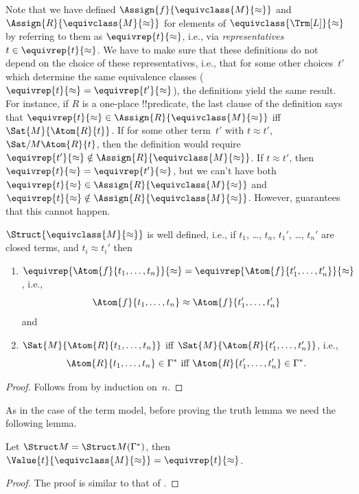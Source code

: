 \documentclass[../../../include/open-logic-section]{subfiles}
\begin{document}
\begin{explain}
Note that we have defined $\Assign{f}{\equivclass{M}{\approx}}$ and
$\Assign{R}{\equivclass{M}{\approx}}$ for elements of
$\equivclass{\Trm[L]}{\approx}$ by referring to them as
$\equivrep{t}{\approx}$, i.e., via \emph{representatives}~$t \in
\equivrep{t}{\approx}$.  We have to make sure that these definitions
do not depend on the choice of these representatives, i.e., that for
some other choices~$t'$ which determine the same equivalence classes
($\equivrep{t}{\approx} = \equivrep{t'}{\approx}$), the definitions
yield the same result. For instance, if $R$ is a one-place
!!{predicate}, the last clause of the definition says that
$\equivrep{t}{\approx} \in \Assign{R}{\equivclass{M}{\approx}}$ iff
$\Sat{M}{\Atom{R}{t}}$. If for some other term~$t'$ with $t \approx
t'$, $\Sat/{M}{\Atom{R}{t}}$, then the definition would require
$\equivrep{t'}{\approx} \notin \Assign{R}{\equivclass{M}{\approx}}$.
If $t \approx t'$, then $\equivrep{t}{\approx} =
\equivrep{t'}{\approx}$, but we can't have both $\equivrep{t}{\approx}
\in \Assign{R}{\equivclass{M}{\approx}}$ and $\equivrep{t}{\approx}
\notin \Assign{R}{\equivclass{M}{\approx}}$.  However,
 guarantees that this cannot happen.
\end{explain}

\begin{prop}
$\Struct{\equivclass{M}{\approx}}$ is well defined, i.e., if $t_1$,
  \dots, $t_n$, $t_1'$, \dots, $t_n'$ are closed terms,
  and $t_i \approx t_i'$ then
\begin{enumerate}
\item $\equivrep{\Atom{f}{t_1,\dots, t_n}}{\approx} =
    \equivrep{\Atom{f}{t_1',\dots, t_n'}}{\approx}$, i.e.,
  \[
  \Atom{f}{t_1,\dots, t_n} \approx \Atom{f}{t_1',\dots, t_n'}
  \]
  and
\item $\Sat{M}{\Atom{R}{t_1,\dots, t_n}}$ iff
  $\Sat{M}{\Atom{R}{t_1',\dots, t_n'}}$, i.e.,
  \[
    \Atom{R}{t_1,\dots, t_n} \in \Gamma^* \text{ iff }
    \Atom{R}{t_1',\dots, t_n'} \in \Gamma^*.
  \]
\end{enumerate}
\end{prop}

\begin{proof}
Follows from  by induction on~$n$.
\end{proof}

As in the case of the term model, before proving the truth lemma we need the
following lemma.

\begin{lem} 
 Let $\Struct M = \Struct M
 (\Gamma^*)$, then $\Value{t}{\equivclass{M}{\approx}} = \equivrep{t}
 {\approx}$.
\end{lem}
\begin{proof} 
The proof is similar to that of .
\end{proof}
\end{document}
